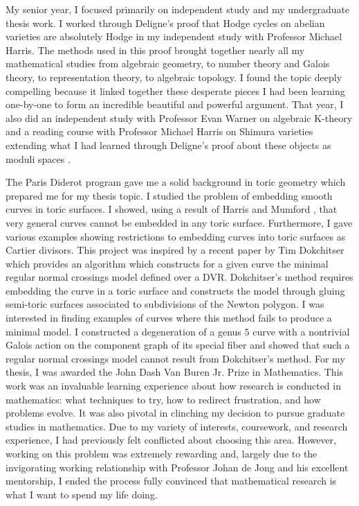\documentclass[11pt]{amsart}
\begin{document}
\par
My senior year, I focused primarily on independent study and my undergraduate thesis work. I worked through Deligne's proof that Hodge cycles on abelian varieties are absolutely Hodge in my independent study with Professor Michael Harris. The methods used in this proof brought together nearly all my mathematical studies from algebraic geometry, to number theory and Galois theory, to representation theory, to algebraic topology. I found the topic deeply compelling because it linked together these desperate pieces I had been learning one-by-one to form an incredible beautiful and powerful argument. That year, I also did an independent study with Professor Evan Warner on algebraic K-theory and a reading course with Professor Michael Harris on Shimura varieties extending what I had learned through Deligne's proof about these objects as moduli spaces .
\par
The Paris Diderot program gave me a solid background in toric geometry which prepared me for my thesis topic. I studied the problem of embedding smooth curves in toric surfaces. I showed, using a result of Harris and Mumford \cite{harris1982kodaira}, that very general curves cannot be embedded in any toric surface. Furthermore, I gave various examples showing restrictions to embedding curves into toric surfaces as Cartier divisors. This project was inspired by a recent paper by Tim Dokchitser \cite{models_of_curves} which provides an algorithm which constructs for a given curve the minimal regular normal crossings model defined over a DVR. Dokchitser's method requires embedding the curve in a toric surface and constructs the model through gluing semi-toric surfaces associated to subdivisions of the Newton polygon. I was interested in finding examples of curves where this method fails to produce a minimal model. I constructed a degeneration of a genus $5$ curve with a nontrivial Galois action on the component graph of its special fiber and showed that such a regular normal crossings model cannot result from Dokchitser's method. For my thesis, I was awarded the John Dash Van Buren Jr. Prize in Mathematics. This work was an invaluable learning experience about how research is conducted in mathematics: what techniques to try, how to redirect frustration, and how problems evolve. It was also pivotal in clinching my decision to pursue graduate studies in mathematics. Due to my variety of interests, coursework, and research experience, I had previously felt conflicted about choosing this area. However, working on this problem was extremely rewarding and, largely due to the invigorating working relationship with Professor Johan de Jong and his excellent mentorship, I ended the process fully convinced that mathematical research is what I want to spend my life doing.
\end{document}
